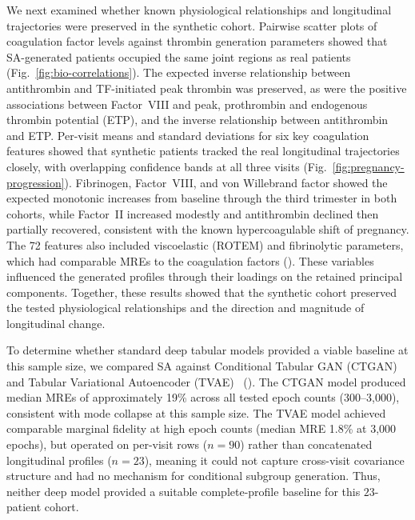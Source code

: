 We next examined whether known physiological relationships and longitudinal
trajectories were preserved in the synthetic cohort. Pairwise scatter plots of
coagulation factor levels against thrombin generation parameters showed that
SA-generated patients occupied the same joint regions as real patients
(Fig.~\ref{fig:bio-correlations}). The expected inverse relationship between
antithrombin and TF-initiated peak thrombin was preserved, as were the positive
associations between Factor~VIII and peak, prothrombin and endogenous thrombin
potential (ETP), and the inverse relationship between antithrombin and ETP.
Per-visit means and standard deviations for six key coagulation features showed
that synthetic patients tracked the real longitudinal trajectories closely, with
overlapping confidence bands at all three visits
(Fig.~\ref{fig:pregnancy-progression}). Fibrinogen, Factor~VIII, and von Willebrand
factor showed the expected monotonic increases from baseline through the third
trimester in both cohorts, while Factor~II increased modestly and antithrombin
declined then partially recovered, consistent with the known hypercoagulable shift
of pregnancy. The 72 features also included viscoelastic (ROTEM) and fibrinolytic
parameters, which had comparable MREs to the coagulation factors
(). These variables influenced the generated profiles
through their loadings on the retained principal components. Together, these results
showed that the synthetic cohort preserved the tested physiological relationships and
the direction and magnitude of longitudinal change.

To determine whether standard deep tabular models provided a viable baseline at this sample
size, we compared SA against Conditional Tabular GAN (CTGAN) and Tabular Variational Autoencoder
(TVAE)~\citep{Xu2019CTGAN} (). The CTGAN model produced median
MREs of approximately 19\% across all tested epoch counts (300--3,000), consistent with
mode collapse at this sample size. The TVAE model achieved comparable marginal fidelity at
high epoch counts (median MRE
1.8\% at 3,000 epochs), but operated on per-visit rows ($n{=}90$) rather than
concatenated longitudinal profiles ($n{=}23$), meaning it could not capture cross-visit
covariance structure and had no mechanism for conditional subgroup generation. Thus, neither
deep model provided a suitable complete-profile baseline for this $23$-patient cohort.

